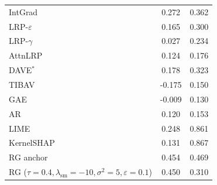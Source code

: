 \begin{tabular}{l c c}
IntGrad & 0.272 & 0.362 \\
LRP-$\varepsilon$ & 0.165 & 0.300 \\
LRP-$\gamma$ & 0.027 & 0.234 \\
AttnLRP & 0.124 & 0.176 \\
DAVE$^{*}$ & 0.178 & 0.323 \\
TIBAV & -0.175 & 0.150 \\
GAE & -0.009 & 0.130 \\
AR & 0.120 & 0.153 \\
LIME & 0.248 & 0.861 \\
KernelSHAP & 0.131 & 0.867 \\
RG anchor & 0.454 & 0.469 \\
RG ($\tau{=}0.4,\lambda_{\mathrm{sm}}{=}{-}10,\sigma^2{=}5,\varepsilon{=}0.1$) & 0.450 & 0.310 \\
\bottomrule
\end{tabular}
